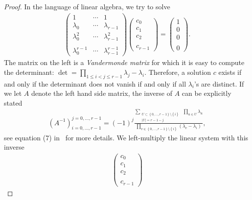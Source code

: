 \begin{proof}
    In the language of linear algebra, we try to solve
    \begin{align*}
        \begin{pmatrix}
            1 & \cdots & 1 \\
            \lambda_0 & \cdots & \lambda_{r-1} \\
            \lambda_0^2 & \cdots & \lambda_{r-1}^2 \\
            & & \\
            \lambda_0^{r-1} & \cdots & \lambda_{r-1}^{r-1}
        \end{pmatrix}
        \begin{pmatrix}
            c_0 \\ c_1 \\ c_2 \\ \\ c_{r-1}
        \end{pmatrix}
        = 
        \begin{pmatrix}
            1 \\ 0 \\ 0 \\ \\ 0
        \end{pmatrix}.
    \end{align*}
    The matrix on the left is a \emph{Vandermonde matrix} for which it is easy to compute the determinant: \(\det = \prod_{1 \leq i < j \leq r - 1} \lambda_j  - \lambda_i\). Therefore, a solution \(c\) exists if and only if the determinant does not vanish if and only if all \(\lambda_i\)'s are distinct. If we let \(A\) denote the left hand side matrix, the inverse of \(A\)  can be explicitly stated 
    \begin{align*}
        (A^{-1})_{i=0,\ldots,r-1}^{j=0,\ldots,r-1} = (-1)^j \frac{\sum\limits_{\substack{U \subset \left\{ 0,\ldots,r-1 \right\} \setminus \left\{ i \right\} \\ |U| = r - 1 -j}} \; \prod\limits_{u \in U} \lambda_u}{\prod\limits_{v \in \left\{ 0,\ldots,r-1 \right\} \setminus \left\{ i \right\}} (\lambda_v - \lambda_i)},
    \end{align*}
    see equation (7) in~\cite{klinger1965vandermonde} for more details. We left-multiply the linear system with this inverse
    \begin{align*}
        \begin{pmatrix}
            c_0 \\ c_1 \\ c_2 \\ \\ c_{r-1}

\end{pmatrix}
\end{align*}
\end{proof}
